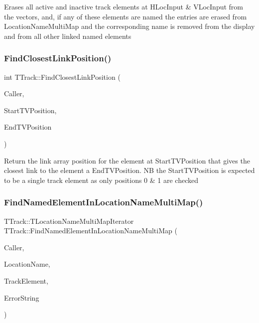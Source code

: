 Erases all active and inactive track elements at H\+Loc\+Input \& V\+Loc\+Input from the vectors, and, if any of these elements are named the entries are erased from Location\+Name\+Multi\+Map and the corresponding name is removed from the display and from all other linked named elements \mbox{\label{class_t_track_a0510eacbf80200ff27d991606acf9924}} 
\subsubsection{\texorpdfstring{Find\+Closest\+Link\+Position()}{FindClosestLinkPosition()}}
{\footnotesize\ttfamily int T\+Track\+::\+Find\+Closest\+Link\+Position (\begin{DoxyParamCaption}\item[{int}]{Caller,  }\item[{int}]{Start\+T\+V\+Position,  }\item[{int}]{End\+T\+V\+Position }\end{DoxyParamCaption})}

Return the link array position for the element at Start\+T\+V\+Position that gives the closest link to the element a End\+T\+V\+Position. NB the Start\+T\+V\+Position is expected to be a single track element as only positions 0 \& 1 are checked \mbox{\label{class_t_track_a694370e3ec67d43da1d8333e06d9ebba}} 
\subsubsection{\texorpdfstring{Find\+Named\+Element\+In\+Location\+Name\+Multi\+Map()}{FindNamedElementInLocationNameMultiMap()}}
{\footnotesize\ttfamily T\+Track\+::\+T\+Location\+Name\+Multi\+Map\+Iterator T\+Track\+::\+Find\+Named\+Element\+In\+Location\+Name\+Multi\+Map (\begin{DoxyParamCaption}\item[{int}]{Caller,  }\item[{Ansi\+String}]{Location\+Name,  }\item[{T\+Track\+Vector\+Iterator}]{Track\+Element,  }\item[{Ansi\+String \&}]{Error\+String }\end{DoxyParamCaption})}

